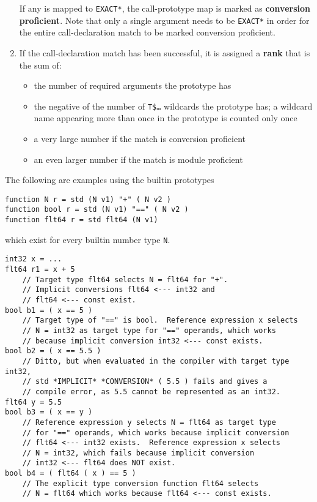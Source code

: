 \documentclass[12pt]{article}
\newcommand{\key}[1]{{\rm \bfseries #1}}
\newenvironment{indpar}[1][0.3in]%
	{\begin{list}{}%
		     {\setlength{\itemsep}{0in}%
		      \setlength{\topsep}{0in}%
		      \setlength{\parsep}{1ex}%
		      \setlength{\labelwidth}{#1}%
		      \setlength{\leftmargin}{#1}%
		      \addtolength{\leftmargin}{\labelsep}}%
	 \item}%
	{\end{list}}
\begin{document}
\begin{enumerate}
If any is mapped to {\tt *EXACT*}, the call-prototype map is
marked as \key{conversion proficient}.  Note that only a single
argument needs to be {\tt *EXACT*} in order for the entire
call-declaration match to be marked conversion proficient.

\item\label{CALL-DECLARATION-RANK-COMPUTATION}
If the call-declaration match has been successful, it is assigned
a \key{rank} that is the sum of:
\begin{itemize}
\item the number of required arguments the prototype has
\item the negative of the number of {\tt T\$\ldots} wildcards
the prototype has; a wildcard name appearing more than once in
the prototype is counted only once
\item a very large number if the match is conversion proficient
\item an even larger number if the match is module proficient
\end{itemize}

\end{enumerate}

The following are examples using the builtin prototypes
\begin{indpar}
{\tt function N r = std (N v1) "+" ( N v2 )} \\
{\tt function bool r = std (N v1) "==" ( N v2 )} \\
{\tt function flt64 r = std flt64 (N v1)}
\end{indpar}
which exist for every builtin number type {\tt N}.
\begin{indpar}[1em]\begin{verbatim}
int32 x = ...
flt64 r1 = x + 5
    // Target type flt64 selects N = flt64 for "+".
    // Implicit conversions flt64 <--- int32 and
    // flt64 <--- const exist.
bool b1 = ( x == 5 )
    // Target type of "==" is bool.  Reference expression x selects
    // N = int32 as target type for "==" operands, which works
    // because implicit conversion int32 <--- const exists.
bool b2 = ( x == 5.5 )
    // Ditto, but when evaluated in the compiler with target type int32,
    // std *IMPLICIT* *CONVERSION* ( 5.5 ) fails and gives a
    // compile error, as 5.5 cannot be represented as an int32.
flt64 y = 5.5
bool b3 = ( x == y )
    // Reference expression y selects N = flt64 as target type
    // for "==" operands, which works because implicit conversion
    // flt64 <--- int32 exists.  Reference expression x selects
    // N = int32, which fails because implicit conversion
    // int32 <--- flt64 does NOT exist.
bool b4 = ( flt64 ( x ) == 5 )
    // The explicit type conversion function flt64 selects
    // N = flt64 which works because flt64 <--- const exists.
\end{verbatim}\end{indpar}
\end{document}
